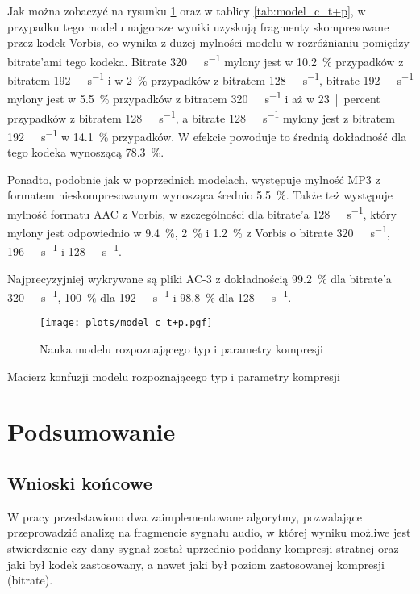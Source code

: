 \documentclass[pl,12pt]{aghdpl}
\let\Oldchapter\chapter%
\renewcommand{\chapter}{\FloatBarrier\Oldchapter}
\let\Oldsection\section%
\renewcommand{\section}{\FloatBarrier\Oldsection}
\begin{document}
Jak można zobaczyć na rysunku \ref{fig:model_c_t+p} oraz w tablicy
\ref{tab:model_c_t+p}, w przypadku tego modelu najgorsze wyniki uzyskują
fragmenty skompresowane przez kodek Vorbis, co wynika z dużej mylności modelu w
rozróżnianiu pomiędzy bitrate'ami tego kodeka. Bitrate
\SI{320}{\kibi\bit\per\second} mylony jest w \SI{10.2}{\percent} przypadków z
bitratem \SI{192}{\kibi\bit\per\second} i w \SI{2}{\percent} przypadków z
bitratem \SI{128}{\kibi\bit\per\second}, bitrate \SI{192}{\kibi\bit\per\second}
mylony jest w \SI{5.5}{\percent} przypadków z bitratem
\SI{320}{\kibi\bit\per\second} i aż w \SI{23}{|percent} przypadków z bitratem
\SI{128}{\kibi\bit\per\second}, a bitrate \SI{128}{\kibi\bit\per\second} mylony
jest z bitratem \SI{192}{\kibi\bit\per\second} w \SI{14.1}{\percent}
przypadków. W efekcie powoduje to średnią dokładność dla tego kodeka
wynoszącą \SI{78.3}{\percent}.

Ponadto, podobnie jak w poprzednich modelach, występuje mylność MP3 z formatem
nieskompresowanym wynosząca średnio \SI{5.5}{\percent}. Także też występuje
mylność formatu AAC z Vorbis, w szczególności dla bitrate'a
\SI{128}{\kibi\bit\per\second}, który mylony jest odpowiednio w \SI{9.4}{\percent},
\SI{2}{\percent} i \SI{1.2}{\percent} z Vorbis o bitrate
\SI{320}{\kibi\bit\per\second}, \SI{196}{\kibi\bit\per\second} i
\SI{128}{\kibi\bit\per\second}.

Najprecyzyjniej wykrywane są pliki AC-3 z dokładnością \SI{99.2}{\percent} dla
bitrate'a \SI{320}{\kibi\bit\per\second}, \SI{100}{\percent} dla
\SI{192}{\kibi\bit\per\second} i \SI{98.8}{\percent} dla
\SI{128}{\kibi\bit\per\second}.

\begin{figure}[!tbh]
  \centering
  \texttt{[image: plots/model\_c\_t+p.pgf]}
  \caption{Nauka modelu rozpoznającego typ i parametry kompresji}
  \label{fig:model_c_t+p}
\end{figure}
\begin{sidewaystable}[!tbh]
  \centering
  \caption{Macierz konfuzji modelu rozpoznającego typ i parametry kompresji}
  
  \label{tab:model_c_t+p}
\end{sidewaystable}

\chapter{Podsumowanie}
\section{Wnioski końcowe}
W pracy przedstawiono dwa zaimplementowane algorytmy, pozwalające
przeprowadzić analizę na fragmencie sygnału audio, w której wyniku możliwe jest
stwierdzenie czy dany sygnał został uprzednio poddany kompresji stratnej oraz
jaki był kodek zastosowany, a nawet jaki był poziom zastosowanej kompresji
(bitrate).
\end{document}
